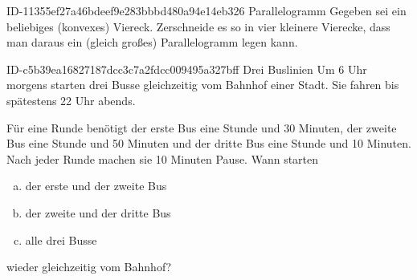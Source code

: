 \begin{exercise}
      {ID-11355ef27a46bdeef9e283bbbd480a94e14eb326}
      {Parallelogramm}
  \ifproblem\problem
    Gegeben sei ein beliebiges (konvexes) Viereck. Zerschneide es so in vier
    kleinere Vierecke, dass man daraus ein (gleich großes) Parallelogramm legen
    kann.
  \fi
\end{exercise}

\begin{exercise}
      {ID-c5b39ea16827187dcc3c7a2fdcc009495a327bff}
      {Drei Buslinien}
  \ifproblem\problem
    Um 6 Uhr morgens starten drei Busse gleichzeitig vom Bahnhof einer Stadt.
    Sie fahren bis spätestens 22 Uhr abends.\par
    Für eine Runde benötigt
    der erste Bus eine Stunde und 30 Minuten,
    der zweite Bus eine Stunde und 50 Minuten und
    der dritte Bus eine Stunde und 10 Minuten.
    Nach jeder Runde machen sie 10 Minuten Pause.
    Wann starten
    \begin{enumerate}[a)]
      \item der erste und der zweite Bus
      \item der zweite und der dritte Bus
      \item alle drei Busse
    \end{enumerate}
    wieder gleichzeitig vom Bahnhof?
  \fi
\end{exercise}

